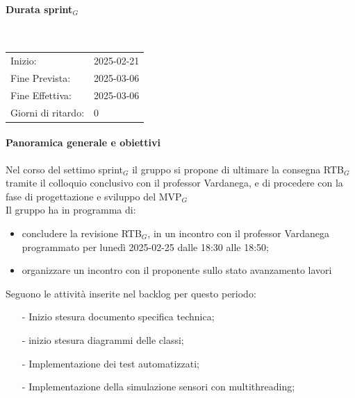 \documentclass[10pt]{article}
\begin{document}
{{{{{{{        \paragraph{Durata sprint$_G$}\mbox{}\\
        \vspace{-1.5em}
        \begin{table}[h] 
        \renewcommand{\arraystretch}{1.2}  
        \begin{tabular}{ l l }
            Inizio: & 2025-02-21 \\
            Fine Prevista: & 2025-03-06 \\
            Fine Effettiva: & 2025-03-06 \\
            Giorni di ritardo: & 0 \\
        \end{tabular}
        \end{table}
        \vspace{-2em}
        {\renewcommand{\arraystretch}{1.5}%
        
        \paragraph{Panoramica generale e obiettivi}\mbox{}\vspace{0.4em}

        Nel corso del settimo sprint$_G$ il gruppo si propone di ultimare la consegna RTB$_G$ tramite il colloquio conclusivo con il professor Vardanega, e di procedere con la fase di progettazione e sviluppo del MVP$_G$
        \\
        Il gruppo ha in programma di:
        \begin{itemize}
            \item concludere la revisione RTB$_G$, in un incontro con il professor Vardanega programmato per lunedì 2025-02-25 dalle 18:30 alle 18:50;
            \item organizzare un incontro con il proponente sullo stato avanzamento lavori
        \end{itemize}

        Seguono le attività inserite nel backlog per questo periodo:
        \vspace{-0.5em}
        \begin{itemize}
        \setlength\itemsep{-0.2em}
        \item [-] Inizio stesura documento specifica technica;
        \item [-] inizio stesura diagrammi delle classi;
        \item [-] Implementazione dei test automatizzati;
        \item [-] Implementazione della simulazione sensori con multithreading;
        \end{itemize}

}}}}}}}}
\end{document}
